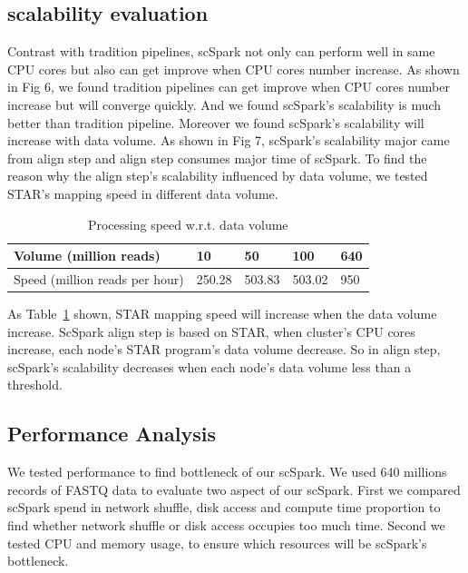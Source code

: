 \documentclass[conference]{IEEEtran}
\begin{document}
\subsection{scalability evaluation}
Contrast with tradition pipelines, scSpark not only can perform well in same CPU cores but also can get improve when CPU cores number increase.
As shown in Fig 6, we found tradition pipelines can get improve when CPU cores number increase but will converge quickly.
And we found scSpark's scalability is much better than tradition pipeline.
Moreover we found scSpark's scalability will increase with data volume.
As shown in Fig 7, scSpark's scalability major came from align step and align step consumes major time of scSpark.
To find the reason why the align step's scalability influenced by data volume, we tested STAR's mapping speed in different data volume.
\begin{table}
  \centering
  \caption{Processing speed w.r.t. data volume}\label{tab3}
	\begin{tabular}{|l | l | l | l | l|}
	\hline
	Volume (million reads) & 10 & 50 & 100 & 640 \\
	\hline
	Speed (million reads per hour) & 250.28 & 503.83 & 503.02 & 950 \\
	\hline
  \end{tabular}
\end{table}
As Table~\ref{tab3} shown, STAR mapping speed will increase when the data volume increase. 
ScSpark align step is based on STAR, when cluster's CPU cores increase, each node's STAR program's data volume decrease.
So in align step, scSpark's scalability decreases when each node's data volume less than a threshold.

\subsection{Performance Analysis}
We tested performance to find bottleneck of our scSpark.
We used 640 millions records of FASTQ data to evaluate two aspect of our scSpark.
First we compared scSpark spend in network shuffle, disk access and compute time proportion to find whether network shuffle or disk access occupies too much time.
Second we tested CPU and memory usage, to ensure which resources will be scSpark's bottleneck.
  
\end{document}

